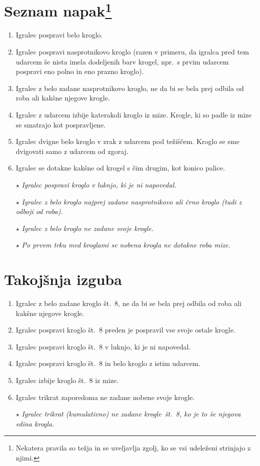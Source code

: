 \documentclass[a4paper,14pt]{extarticle}
\begin{document}
\begin{multicols}{2}
    \section[Seznam napak]{Seznam napak\footnote{\label{hard_mode}Nekatera pravila so težja in se uveljavlja zgolj, ko se vsi udeleženi strinjajo z njimi.}}
    \begin{enumerate}
        \item Igralec pospravi belo kroglo.
        \item Igralec pospravi nasprotnikovo kroglo (razen v primeru, da igralca pred tem udarcem še nista imela dodeljenih barv krogel, npr.~s prvim udarcem pospravi eno polno in eno prazno kroglo).
        \item Igralec z belo zadane nasprotnikovo kroglo, ne da bi se bela prej odbila od roba ali kakšne njegove krogle.
        \item Igralec z udarcem izbije katerakoli kroglo iz mize. Krogle, ki so padle iz mize se smatrajo kot pospravljene.
        \item Igralec dvigne belo kroglo v zrak z udarcem pod težiščem. Kroglo se sme dvigovati samo z udarcem od zgoraj.
        \item Igralec se dotakne kakšne od krogel s čim drugim, kot konico palice.
        \item[$\star$\footref{hard_mode}] \textit{\emph{Igralec pospravi kroglo v luknjo, ki je ni napovedal.}}
        \item[$\star$\footref{hard_mode}] \textit{\emph{Igralec z belo kroglo najprej zadane nasprotnikovo ali črno kroglo (tudi z odboji od roba).}}
        \item[$\star$\footref{hard_mode}] \textit{\emph{Igralec z belo kroglo ne zadane svoje krogle.}}
        \item[$\star$\footref{hard_mode}] \textit{\emph{Po prvem trku med kroglami se nobena krogla ne dotakne roba mize.}}
    \end{enumerate}

    \section{Takojšnja izguba}
    \begin{enumerate}
        \item Igralec z belo zadane kroglo št.~8, ne da bi se bela prej odbila od roba ali kakšne njegove krogle.
        \item Igralec pospravi kroglo št.~8 preden je pospravil vse svoje ostale krogle.
        \item Igralec pospravi kroglo št.~8 v luknjo, ki je ni napovedal.
        \item Igralec pospravi kroglo št.~8 in belo kroglo z istim udarcem.
        \item Igralec izbije kroglo št.~8 iz mize.
        \item Igralec trikrat zaporedoma ne zadane nobene svoje krogle.
        \item[$\star$\footref{hard_mode}] \textit{\emph{Igralec trikrat (kumulativno) ne zadane krogle št.~8, ko je to še njegova edina krogla.}}
    \end{enumerate}
\end{multicols}
\end{document}
